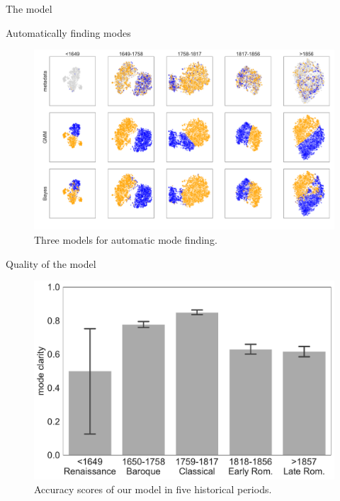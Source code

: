 \begin{frame}{The model}
    
\end{frame}

\begin{frame}{Automatically finding modes}
    \begin{figure}
        \centering
        \includegraphics[width=\linewidth,height=.8\textheight,keepaspectratio]{img/Figure4.pdf}
        \caption{Three models for automatic mode finding.}
    \end{figure}
\end{frame}

\begin{frame}{Quality of the model}
    \begin{figure}
        \centering
        \includegraphics[width=\linewidth,height=.7\textheight,keepaspectratio]{img/Figure5.pdf}
        \caption{Accuracy scores of our model in five historical periods.}
    \end{figure}
\end{frame}

